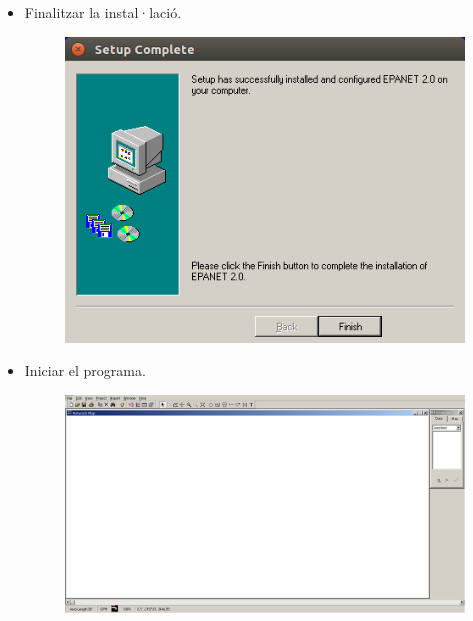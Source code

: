 \documentclass[12pt]{article}
\begin{document}
\begin{enumerate}
\begin{itemize}
\begin{figure}[h!]
		\end{figure}
		\clearpage\item Finalitzar la instal·lació.
		\begin{figure}[h!]
			\centering
			\includegraphics[scale=.3]{imatges/epanet/inst/3.png}
		\end{figure}
		\item Iniciar el programa.
		\begin{figure}[h!]
			\centering
			\includegraphics[scale=.15]{imatges/epanet/inst/4.png}
		\end{figure}
	\end{itemize}
\end{enumerate}
\end{document}
